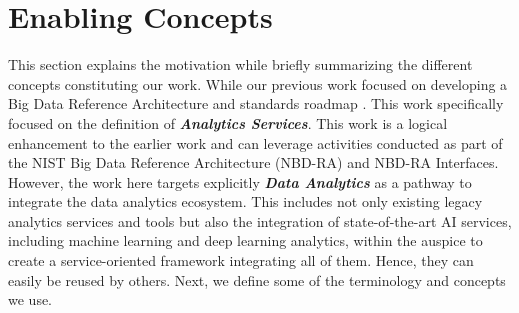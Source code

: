 

\section{Enabling Concepts}\label{s:background}

This section explains the motivation while briefly summarizing the
different concepts constituting our work. While our previous work
focused on developing a Big Data Reference Architecture and standards
roadmap \cite{nist-v8}. This work specifically focused on the
definition of {\bf\em Analytics Services}. This work is a logical
enhancement to the earlier work and can leverage activities conducted
as part of the NIST Big Data Reference Architecture (NBD-RA) and
NBD-RA Interfaces. However, the work here targets explicitly {\bf\em
Data Analytics} as a pathway to integrate the data analytics
ecosystem. This includes not only existing legacy analytics services
and tools but also the integration of state-of-the-art AI services,
including machine learning and deep learning analytics, within the
auspice to create a service-oriented framework integrating all of
them. Hence, they can easily be reused by others. Next, we define some
of the terminology and concepts we use.



